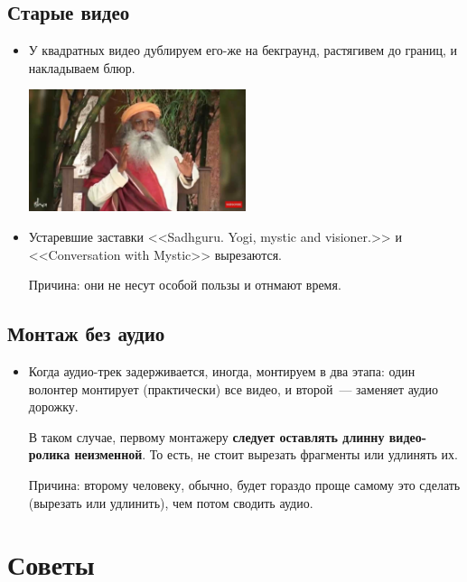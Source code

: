 \documentclass[
a4paper, %
12pt, %
article,
onecolumn, %
openany, %
]{memoir}
\begin{document}
\subsection{Старые видео}

\begin{itemize}

  \item У квадратных видео дублируем его-же на бекграунд, растягивем до границ,
        и накладываем блюр.
        \begin{center} \includegraphics[width=0.5\textwidth]{tooWide}  \end{center}

  \item Устаревшие заставки <<Sadhguru. Yogi, mystic and visioner.>> и
        <<Conversation with Mystic>> вырезаются.

        {\color{gray}Причина: они не несут особой пользы и отнмают время.}
\end{itemize}


\subsection{Монтаж без аудио}

\begin{itemize}
  \item Когда аудио-трек задерживается, иногда, монтируем в два
        этапа: один волонтер монтирует (практически) все видео, и
        второй~--- заменяет аудио дорожку.

        В таком случае, первому монтажеру \textbf{следует оставлять
          длинну видео-ролика неизменной}. То есть, не стоит вырезать
        фрагменты или удлинять их.

        Причина: второму человеку, обычно, будет гораздо проще
        самому это сделать (вырезать или удлинить), чем потом сводить аудио.
\end{itemize}

\newpage
\section{Советы}\label{advices}
\end{document}
